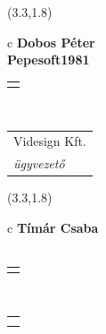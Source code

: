 \documentclass[11pt]{article}
\begin{document}
\makebox(3.3,1.8){
  \renewcommand\arraystretch{1.3}
  \begin{tabular}[c]{c}
    \hspace{8.5mm}
    \LARGE\bf{ Dobos Péter }\\
    \hspace{8.5mm}
    \Large{ Pepesoft1981 }\\
    \renewcommand\arraystretch{3}
    \begin{tabular}[c]{c}
      \centering
      \fontfamily{phv}\selectfont{
        \textbf{
          \textsc{
            \scriptsize{
            \color{Dark}{ Ismerkedő }\color{Bright}{ Webmester }\color{Bright}{ Sminkmester }\color{Bright}{ Programozó }
            }
          }
        }
      }
    \end{tabular}
    \\
    \renewcommand\arraystretch{1}
    \begin{tabular}{p{3.3in}}
      \hspace{.7cm}Videsign Kft.\\
      \hspace{.7cm}\emph{ ügyvezető }\\
    \end{tabular}
  \end{tabular}
}

\makebox(3.3,1.8){
  \renewcommand\arraystretch{1.3}
  \begin{tabular}[c]{c}
    \hspace{8.5mm}
    \LARGE\bf{ Tímár Csaba }\\
    \hspace{8.5mm}
    \Large{  }\\
    \renewcommand\arraystretch{3}
    \begin{tabular}[c]{c}
      \centering
      \fontfamily{phv}\selectfont{
        \textbf{
          \textsc{
            \scriptsize{
            \color{Bright}{ Ismerkedő }\color{Bright}{ Webmester }\color{Dark}{ Sminkmester }\color{Dark}{ Programozó }
            }
          }
        }
      }
    \end{tabular}
    \\
    \renewcommand\arraystretch{1}
    \begin{tabular}{p{3.3in}}
      \hspace{.7cm}\\
      \hspace{.7cm}\emph{  }\\
    \end{tabular}
  \end{tabular}
}
\end{document}

